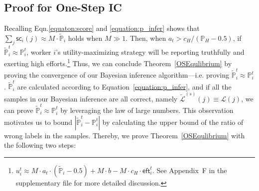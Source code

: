 \subsection{Proof for One-Step IC}
Recalling Eqn.\ref{equaton:score} and \ref{equation:p_infer} shows that $\sum_j \textsf{sc}_i(j)\approx M\cdot \tilde{\mathbb{P}}_i$ holds when $M\gg 1$. Then, when $a_t>c_H/(\mathbb{P}_H-0.5)$, if $\tilde{\mathbb{P}}^t_i\approx \mathbb{P}^t_i$, worker $i$'s utility-maximizing strategy will be reporting truthfully and exerting high efforts.\footnote{$u_i^t\approx  M\cdot a_t\cdot (\tilde{\mathbb{P}}_i-0.5) + M\cdot b- M \cdot c_H\cdot \textsf{eft}^{t}_i$. See Appendix~F in the supplementary file for more detailed discussion. 
}
Thus, we can conclude Theorem~\ref{OSEqulibrium} by proving the convergence of our Bayesian inference algorithm---i.e. proving $\tilde{\mathbb{P}}^t_i\approx \mathbb{P}^t_i$.
$\tilde{\mathbb{P}}^t_i$ are calculated according to Equation~\ref{equation:p_infer}, and if all the samples in our Bayesian inference are all correct, namely $\tilde{\mathcal{L}}^{(s)}(j)\equiv\mathcal{L}(j)$, we can prove $\tilde{\mathbb{P}}^t_i\approx \mathbb{P}^t_i$ by leveraging the law of large numbers.
This observation motivates us to bound $|\tilde{\mathbb{P}}^t_i-\mathbb{P}^t_i|$ by calculating the upper bound of the ratio of wrong labels in the samples.
Thereby, we prove Theorem~\ref{OSEqulibrium} with the following two steps:

